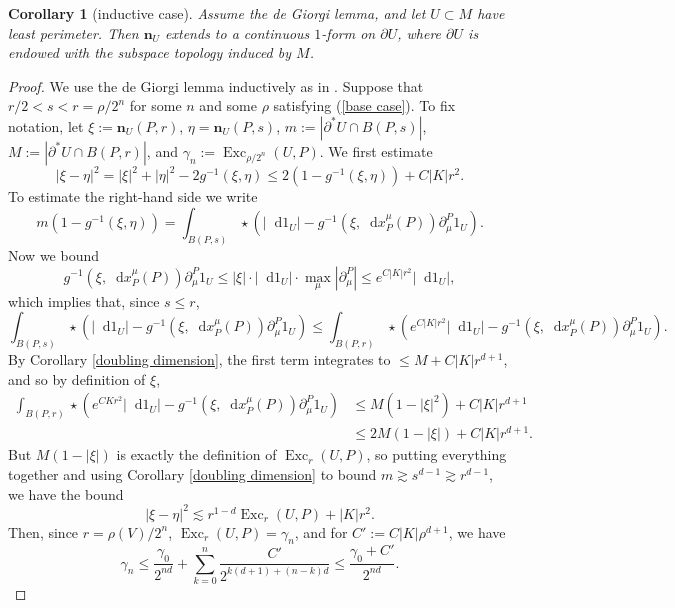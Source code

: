 \documentclass[reqno,11pt]{amsart}
\DeclareMathOperator{\Exc}{Exc}
\newcommand*\dif{\mathop{}\!\mathrm{d}}
\newcommand{\normal}{\mathbf n}
\newtheorem{corollary}[theorem]{Corollary}
\theoremstyle{definition}
\numberwithin{equation}{section}
\begin{document}
\begin{corollary}[inductive case]
Assume the de Giorgi lemma, and let $U \subset M$ have least perimeter.
Then $\normal_U$ extends to a continuous $1$-form on $\partial U$, where $\partial U$ is endowed with the subspace topology induced by $M$.
\end{corollary}
\begin{proof}
We use the de Giorgi lemma inductively as in \cite[Theorem 8.2]{Giusti77}.
Suppose that $r/2 < s < r = \rho/2^n$ for some $n$ and some $\rho$ satisfying (\ref{base case}).
To fix notation, let
$\xi := \normal_U(P, r)$, $\eta = \normal_U(P, s)$, $m := |\partial^* U \cap B(P, s)|$, $M := |\partial^* U \cap B(P, r)|$, and $\gamma_n := \Exc_{\rho/2^n}(U, P)$.
We first estimate
$$|\xi - \eta|^2 = |\xi|^2 + |\eta|^2 - 2 g^{-1}(\xi, \eta) \leq 2(1 - g^{-1}(\xi, \eta)) + C|K|r^2.$$
To estimate the right-hand side we write
$$m(1 - g^{-1}(\xi, \eta)) = \int_{B(P, s)} \star(|\dif 1_U| - g^{-1}(\xi, \dif x^\mu_P(P)) \partial^P_\mu 1_U).$$
Now we bound
$$ g^{-1}(\xi, \dif x^\mu_P(P)) \partial^P_\mu 1_U \leq |\xi| \cdot |\dif 1_U| \cdot \max_\mu |\partial^P_\mu| \leq e^{C|K|r^2} |\dif 1_U|,$$
which implies that, since $s \leq r$,
$$\int_{B(P, s)} \star(|\dif 1_U| - g^{-1}(\xi, \dif x^\mu_P(P)) \partial^P_\mu 1_U) \leq \int_{B(P, r)} \star(e^{C|K|r^2} |\dif 1_U| - g^{-1}(\xi, \dif x^\mu_P(P)) \partial^P_\mu 1_U).$$
By Corollary \ref{doubling dimension}, the first term integrates to $\leq M + C|K|r^{d + 1}$, and so by definition of $\xi$,
\begin{align*}
\int_{B(P, r)} \star(e^{CKr^2} |\dif 1_U| - g^{-1}(\xi, \dif x^\mu_P(P)) \partial^P_\mu 1_U) &\leq M(1 - |\xi|^2) + C|K|r^{d + 1}\\
&\leq 2M(1 - |\xi|) + C|K|r^{d + 1}.
\end{align*}
But $M(1 - |\xi|)$ is exactly the definition of $\Exc_r(U, P)$, so putting everything together and using Corollary \ref{doubling dimension} to bound $m \gtrsim s^{d - 1} \gtrsim r^{d - 1}$, we have the bound
\begin{equation}\label{just need the excess}
|\xi - \eta|^2 \lesssim r^{1 - d} \Exc_r(U, P) + |K|r^2.
\end{equation}
Then, since $r = \rho(V)/2^n$, $\Exc_r(U, P) = \gamma_n$, and for $C' := C|K|\rho^{d + 1}$, we have
\begin{equation}\label{induction on gamma}
\gamma_n \leq \frac{\gamma_0}{2^{nd}} + \sum_{k=0}^n \frac{C'}{2^{k(d + 1) + (n - k)d}} \leq \frac{\gamma_0 + C'}{2^{nd}}.
\end{equation}

\end{proof}
\end{document}

